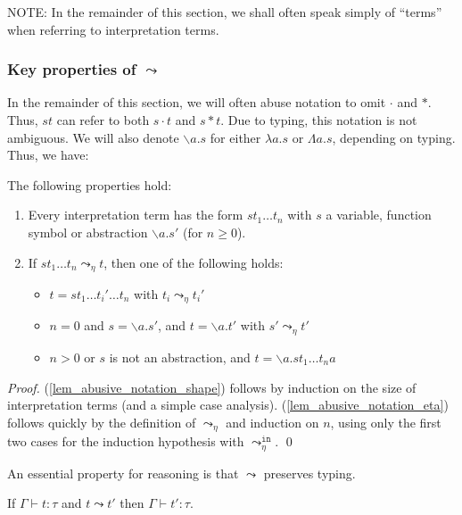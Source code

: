 \documentclass[runningheads,a4paper]{llncs}
\newcommand{\arreta}{\leadsto_\eta}
\newcommand{\arretain}{\leadsto_\eta^{\mathtt{in}}}
\newcommand{\arrnormalise}{\leadsto}
\newcommand{\abs}[2]{\lambda #1.#2}
\newcommand{\tabs}[2]{\Lambda #1.#2}
\newcommand{\abstraction}[2]{\backslash #1.#2}
\newcommand{\app}[2]{#1 \cdot #2}
\newcommand{\tapp}[2]{#1 * #2}
\begin{document}
NOTE: In the remainder of this section, we shall often speak simply of
``terms'' when referring to interpretation terms.

\subsubsection{Key properties of $\arrnormalise$}

In the remainder of this section, we will often abuse notation to omit
$\cdot$ and $*$.  Thus, $s t$ can refer to both $\app{s}{t}$ and
$\tapp{s}{t}$.  Due to typing, this notation is not ambiguous.
We will also denote $\abstraction{a}{s}$ for either $\abs{a}{s}$ or
$\tabs{a}{s}$, depending on typing.  Thus, we have:

\begin{lemma}\label{lem_abusive_notation}
The following properties hold:
\begin{enumerate}
\item\label{lem_abusive_notation_shape}
  Every interpretation term has the form $s t_1 \dots t_n$ with
  $s$ a variable, function symbol or abstraction $\abstraction{a}{s'}$
  (for $n \geq 0$).
\item\label{lem_abusive_notation_eta}
  If $s t_1 \dots t_n \arreta t$, then one of the following holds:
  \begin{itemize}
  \item $t = s t_1 \dots t_i' \dots t_n$ with $t_i \arreta t_i'$
  \item $n = 0$ and $s = \abstraction{a}{s'}$, and $t = \abstraction{a
    }{t'}$ with $s' \arreta t'$
  \item $n > 0$ or $s$ is not an abstraction, and $t =
    \abstraction{a}{s t_1 \dots t_n a}$
  \end{itemize}
\end{enumerate}
\end{lemma}

\begin{proof}
(\ref{lem_abusive_notation_shape}) follows by induction on the size of
interpretation terms (and a simple case analysis).
(\ref{lem_abusive_notation_eta}) follows quickly by the definition of
$\arreta$ and induction on $n$, using only the first two cases for the
induction hypothesis with $\arretain$.
\qed
\end{proof}

An essential property for reasoning is that $\arrnormalise$ preserves
typing.

\begin{lemma}
  If $\Gamma \vdash t : \tau$ and $t \arrnormalise t'$ then
  $\Gamma \vdash t' : \tau$.
\end{lemma}
\end{document}

